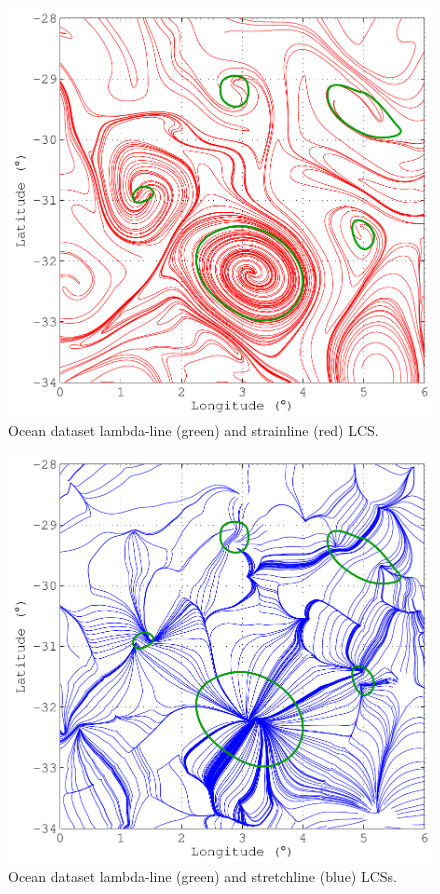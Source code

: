 \documentclass{article}
\begin{document}
\begin{figure}
\begin{center}
\includegraphics[width=\textwidth]{graphics/ocean_dataset/hyperbolic_shear_lcs_strainline}
\end{center}
\caption{Ocean dataset lambda-line (green) and strainline (red) LCS.}
\label{f:ocean dataset hyperbolic shear lcs strainline}
\end{figure}

\begin{figure}
\begin{center}
\includegraphics[width=\textwidth]{graphics/ocean_dataset/hyperbolic_shear_lcs_stretchline}
\end{center}
\caption{Ocean dataset lambda-line (green) and stretchline (blue) LCSs.}
\label{f:ocean dataset hyperbolic shear lcs stretchline}
\end{figure}
\end{document}

